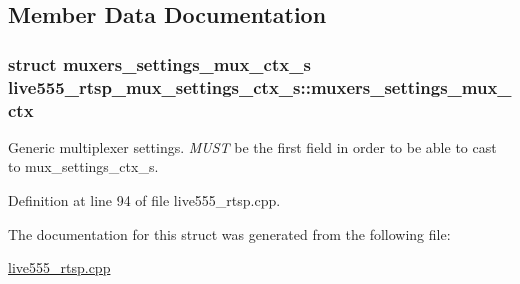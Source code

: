 \subsection{Member Data Documentation}
\subsubsection[{\texorpdfstring{muxers\+\_\+settings\+\_\+mux\+\_\+ctx}{muxers_settings_mux_ctx}}]{\setlength{\rightskip}{0pt plus 5cm}struct {\bf muxers\+\_\+settings\+\_\+mux\+\_\+ctx\+\_\+s} live555\+\_\+rtsp\+\_\+mux\+\_\+settings\+\_\+ctx\+\_\+s\+::muxers\+\_\+settings\+\_\+mux\+\_\+ctx}\hypertarget{structlive555__rtsp__mux__settings__ctx__s_ab882e923aec197102778eaa816fa940b}{}\label{structlive555__rtsp__mux__settings__ctx__s_ab882e923aec197102778eaa816fa940b}
Generic multiplexer settings. {\itshape M\+U\+ST} be the first field in order to be able to cast to mux\+\_\+settings\+\_\+ctx\+\_\+s. 

Definition at line 94 of file live555\+\_\+rtsp.\+cpp.



The documentation for this struct was generated from the following file\+:\begin{DoxyCompactItemize}
\item 
\hyperlink{live555__rtsp_8cpp}{live555\+\_\+rtsp.\+cpp}\end{DoxyCompactItemize}

